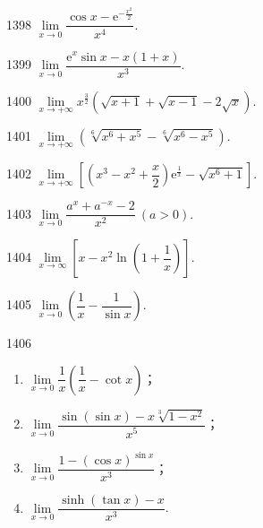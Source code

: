 
\begin{prob}[S]{1398}
$\lim\limits_{x \to 0} \dfrac{\cos x - \mathrm{e}^{-\frac{x^2}{2}}}{x^4}$.
\end{prob}

\begin{prob}[S]{1399}
$\lim\limits_{x \to 0} \dfrac{\mathrm{e}^x \sin x - x(1 + x)}{x^3}$.
\end{prob}

\begin{prob}[S]{1400}
$\lim\limits_{x \to +\infty} x^{\frac{3}{2}} (\sqrt{x + 1} + \sqrt{x - 1} - 2\sqrt{x})$.
\end{prob}

\begin{prob}[S]{1401}
$\lim\limits_{x \to +\infty} (\sqrt[6]{x^6 + x^5} - \sqrt[6]{x^6 - x^5})$.
\end{prob}

\begin{prob}[S]{1402}
$\lim\limits_{x \to +\infty} \left[\left(x^3 - x^2 + \dfrac{x}{2}\right)\mathrm{e}^{\frac{1}{x}} - \sqrt{x^6 + 1}\right]$.
\end{prob}

\begin{prob}[S]{1403}
$\lim\limits_{x \to 0} \dfrac{a^x + a^{-x} - 2}{x^2} \ (a > 0)$.
\end{prob}

\begin{prob}[S]{1404}
$\lim\limits_{x \to \infty} \left[x - x^2 \ln\left(1 + \dfrac{1}{x}\right)\right]$.
\end{prob}

\begin{prob}[S]{1405}
$\lim\limits_{x \to 0} \left(\dfrac{1}{x} - \dfrac{1}{\sin x}\right)$.
\end{prob}

\begin{prob}[L]{1406}
\begin{enumerate}[label=(\alph*), itemsep=2pt, topsep=3pt]
    \item $\lim\limits_{x \to 0} \dfrac{1}{x} \left(\dfrac{1}{x} - \cot x\right)$；
    \item $\lim\limits_{x \to 0} \dfrac{\sin(\sin x) - x\sqrt[3]{1 - x^2}}{x^5}$；
    \item $\lim\limits_{x \to 0} \dfrac{1 - (\cos x)^{\sin x}}{x^3}$；
    \item $\lim\limits_{x \to 0} \dfrac{\sinh(\tan x) - x}{x^3}$.
\end{enumerate}
\end{prob}

